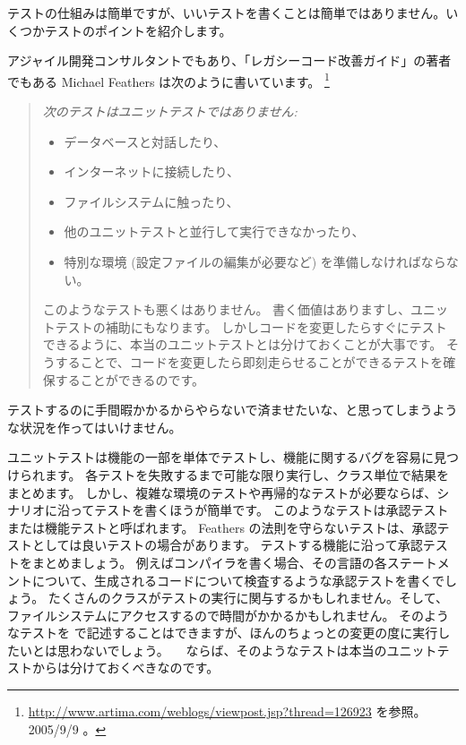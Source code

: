 \documentclass[a4paper,10pt,twoside]{book}
\begin{document}
テストの仕組みは簡単ですが、いいテストを書くことは簡単ではありません。いくつかテストのポイントを紹介します。

\begin{description}
\item[Feathers のユニットテストの法則。]
  アジャイル開発コンサルタントでもあり、「レガシーコード改善ガイド」の著者でもある Michael Feathers は次のように書いています。 \footnote{\url{http://www.artima.com/weblogs/viewpost.jsp?thread=126923} を参照。 2005/9/9 。}
  \begin{quotation}
  \noindent
  {\it
  次のテストはユニットテストではありません:
  \begin{itemize}
	\item データベースと対話したり、
	\item インターネットに接続したり、
	\item ファイルシステムに触ったり、
	\item 他のユニットテストと並行して実行できなかったり、
	\item 特別な環境 (設定ファイルの編集が必要など) を準備しなければならない。
 \end{itemize}

このようなテストも悪くはありません。
書く価値はありますし、ユニットテストの補助にもなります。
しかしコードを変更したらすぐにテストできるように、本当のユニットテストとは分けておくことが大事です。
そうすることで、コードを変更したら即刻走らせることができるテストを確保することができるのです。

 }
  \end{quotation}

テストするのに手間暇かかるからやらないで済ませたいな、と思ってしまうような状況を作ってはいけません。

 \item[ユニットテスト \textit{vs.}\ 承認テスト] ユニットテストは機能の一部を単体でテストし、機能に関するバグを容易に見つけられます。
  各テストを失敗するまで可能な限り実行し、クラス単位で結果をまとめます。
  しかし、複雑な環境のテストや再帰的なテストが必要ならば、シナリオに沿ってテストを書くほうが簡単です。
  このようなテストは承認テストまたは機能テストと呼ばれます。
  Feathers の法則を守らないテストは、承認テストとしては良いテストの場合があります。
  テストする機能に沿って承認テストをまとめましょう。
  例えばコンパイラを書く場合、その言語の各ステートメントについて、生成されるコードについて検査するような承認テストを書くでしょう。
  たくさんのクラスがテストの実行に関与するかもしれません。そして、ファイルシステムにアクセスするので時間がかかるかもしれません。
  そのようなテストを \sunit で記述することはできますが、ほんのちょっとの変更の度に実行したいとは思わないでしょう。
　ならば、そのようなテストは本当のユニットテストからは分けておくべきなのです。


\end{description}
\end{document}
